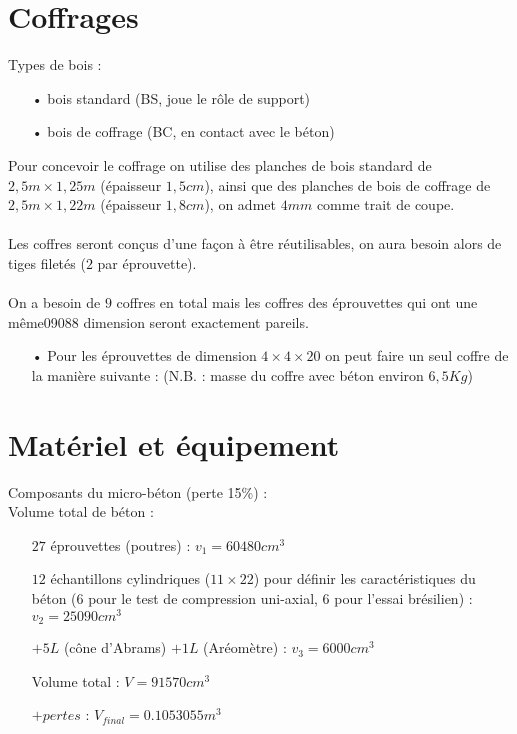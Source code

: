 \documentclass[12pt]{report}
\begin{document}


\section{Coffrages}
Types de bois :\\
\begin{itemize}
 
\item[•] bois standard (BS, joue le rôle de support)
\item[•] bois de coffrage (BC, en contact avec le béton)\\

\end{itemize}
Pour concevoir le coffrage on utilise des planches de bois standard de $2,5m \times{} 1,25m$
(épaisseur $1,5 cm$), ainsi que des planches de bois de coffrage de $2,5m \times{} 1,22m$ (épaisseur $1,8 cm$), on admet $4 mm$ comme trait de coupe.
\\\\
Les coffres seront conçus d’une façon à être réutilisables, on aura besoin alors de tiges
filetés ($2$ par éprouvette).
\\\\
On a besoin de $9$ coffres en total mais les coffres des éprouvettes qui ont une même09088
dimension seront exactement pareils.
\\
\begin{itemize}
 
\item[•] Pour les éprouvettes de dimension $4\times 4\times 20$ on peut faire un seul coffre de la manière
suivante : (N.B. : masse du coffre avec béton environ $6,5Kg$)


\end{itemize}

\section{Matériel et équipement}
Composants du micro-béton (perte 15\%) :\\
Volume total de béton :\\
\begin{itemize} 
\item[\triangleright] $27$ éprouvettes (poutres) : $v_1 = 60480 cm^3$
\item[\triangleright] $12$ échantillons cylindriques ($11\times 22$) pour définir les caractéristiques du béton (6 pour le
   test de compression uni-axial, 6 pour l’essai brésilien) : $v_2 = 25090 cm^3$   
\item[\triangleright] $+5L$ (cône d’Abrams) $+1L$ (Aréomètre) : $v_3 = 6000 cm^3$
\item[\triangleright] Volume total : $V = 91570 cm^3$
\item[\triangleright] $+pertes$ : $V_{final} = 0.1053055 m^3$\\
\end{itemize}
\end{document}
